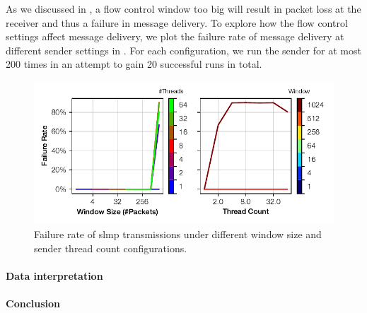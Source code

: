 As we discussed in , a flow control window too big will result in packet loss at the receiver and thus a failure in message delivery.  To explore how the flow control settings affect message delivery, we plot the failure rate of message delivery at different sender settings in .  For each configuration, we run the sender for at most 200 times in an attempt to gain 20 successful runs in total.

\begin{figure}[tp]
    \centering
    \includegraphics{thesis/figures/slmp-loss.pdf}
    \caption{Failure rate of \ac{slmp} transmissions under different window size and sender thread count configurations.} \label{fig:slmp-loss}
\end{figure}

\paragraph{Data interpretation}


\paragraph{Conclusion}

